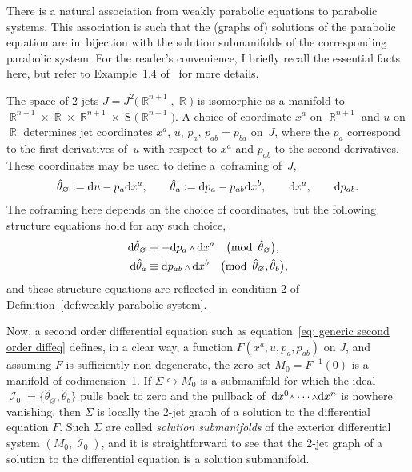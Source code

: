 \documentclass[pdftex]{sigma}
\DeclareMathOperator{\R}{\mathbb{R}}
\DeclareMathOperator{\Sym}{S}
\DeclareMathOperator{\I}{\mathcal{I}}
\renewcommand{\d}{{\rm d}}
\renewcommand{\mod}[1]{\quad\big(\mathrm{mod\enspace} #1\big)}
\newcommand{\w}{{\mathchoice{\,{\scriptstyle\wedge}\,}{{\scriptstyle\wedge}}
 {{\scriptscriptstyle\wedge}}{{\scriptscriptstyle\wedge}}}}
\numberwithin{equation}{section}
\begin{document}
\begin{Remark}
 There is a natural association from weakly parabolic equations to parabolic systems.
 This association is such that
 the (graphs of) solutions of the parabolic equation are in~bijection with the solution submanifolds of the corresponding parabolic system.
 For the reader's convenience, I briefly recall the essential facts here, but refer to
 Example~1.4 of~\cite{McMillan:ParabolicsI} for more details.

 The space of 2-jets $J = J^2\big(\!\R^{n+1},\R\!\big)$ is isomorphic as a manifold to $ \R^{n+1} \!\times\! \R \!\times\! \R^{n+1} \!\times\! \Sym\big(\!\R^{n+1}\!\big) $.
 A choice of coordinate $ x^a $ on $ \R^{n+1} $ and $ u $ on $ \R $ determines jet coordinates $ x^a$, $u$, $p_a$, $p_{ab}=p_{ba} $ on~$ J $, where the $p_a$ correspond to the first derivatives of~$u$ with respect to $x^a$ and $p_{ab}$ to the second derivatives.
 These coordinates may be used to define a~coframing of~$ J $,
 \begin{gather}\label{eq: generic second order coframing}
 \hat\theta_\varnothing := \d u - p_a\d x^a, \qquad
 \hat\theta_a := \d p_a - p_{ab}\d x^b, \qquad \d x^a, \qquad\d p_{ab} .
 \end{gather}
 The coframing here depends on the choice of coordinates, but the following structure equations hold for any such choice,
 \begin{align*}
 \d\hat\theta_\varnothing & \equiv - \d p_a \w \d x^a \mod{\hat\theta_{\varnothing}},
 \\
 \d\hat\theta_a & \equiv \d p_{ab} \w \d x^b \mod{\hat\theta_{\varnothing}, \hat\theta_{b}} ,
 \end{align*}
 and these structure equations are reflected in condition 2 of Definition~\ref{def:weakly parabolic system}.

 Now, a second order differential equation such as equation~\eqref{eq: generic second order diffeq} defines, in a clear way, a function $ F(x^a,u,p_a,p_{ab}) $ on $ J $, and assuming $ F $ is sufficiently non-degenerate, the zero set $ M_0 = F^{-1}(0) $ is a manifold of codimension~1.
 If $ \Sigma \hookrightarrow M_0 $ is a submanifold for which the ideal $ \I_0 = \big\{ \hat\theta_{\varnothing}, \hat\theta_{b} \big\} $ pulls back to zero and the pullback of~$ \d x^0 \w\cdots\w \d x^n $ is nowhere vanishing,
 then $ \Sigma $ is locally the 2-jet graph of a solution to the differential equation $F$.
 Such $ \Sigma $ are called \emph{solution submanifolds} of the exterior differential system $ (M_0, \I_0) $, and it is straightforward to see that the 2-jet graph of a solution to the differential equation is a solution submanifold.


\end{Remark}
\end{document}
